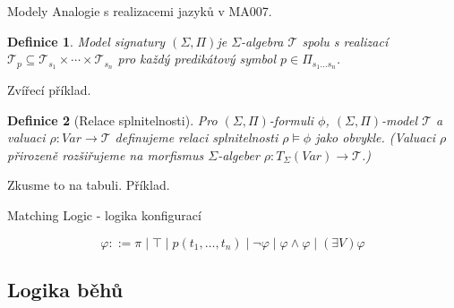 \documentclass[11pt]{beamer}
\newtheorem{dfn}{Definice}
\newtheorem{pozn}{Poznámka}
\begin{document}
\newcommand{\folSignature}{$\left( \Sigma, \Pi \right)$}

\begin{frame}{Modely}
Analogie s realizacemi jazyků v MA007.
\begin{dfn}
Model signatury \folSignature je $\Sigma$-algebra $\mathcal{T}$ spolu s realizací $\mathcal{T}_p \subseteq \mathcal{T}_{s_1} \times \cdots \times \mathcal{T}_{s_n} $ pro každý predikátový symbol $p \in \Pi_{s_1 \ldots s_n}$.
\end{dfn}

\pause
Zvířecí příklad.
\pause

\begin{dfn}[Relace splnitelnosti]
Pro \folSignature -formuli $\phi$, \folSignature -model $\mathcal{T}$ a valuaci $\rho : Var \rightarrow \mathcal{T}$ definujeme relaci splnitelnosti $\rho \models \phi$ jako obvykle. (Valuaci $\rho$ přirozeně rozšiřujeme na morfismus $\Sigma$-algeber $\rho : T_{\Sigma}\left( Var \right) \rightarrow \mathcal{T}$.)
\end{dfn}
\pause
Zkusme to na tabuli.
\pause
Příklad.


%
%

\end{frame}
%


\begin{frame}{Matching Logic - logika konfigurací}

\begin{equation}
\varphi ::= \pi \mid \top \mid p(t_1,\ldots,t_n) \mid \neg \varphi \mid \varphi \land \varphi \mid \left( \exists V \right) \varphi
\end{equation}
\end{frame}


\subsection{Logika běhů}
\end{document}

